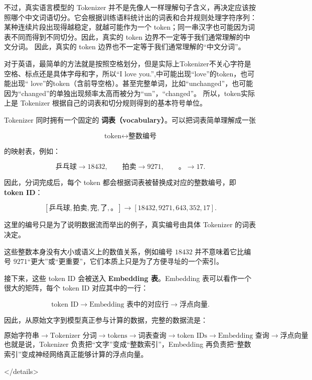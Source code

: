 \documentclass[UTF8,11pt,a4paper]{ctexart}
\begin{document}
不过，真实语言模型的 Tokenizer 并不是先像人一样理解句子含义，再决定应该按照哪个中文词语切分。它会根据训练语料统计出的词表和合并规则处理字符序列：某种连续片段出现得越稳定，就越可能作为一个 token；同一串汉字也可能因为词表不同而得到不同切分。因此，真实的 token 边界不一定等于我们通常理解的中文分词。
因此，真实的 token 边界也不一定等于我们通常理解的“中文分词”。

对于英语，最简单的方法就是按照空格划分，但是实际上Tokenizer不关心字符是空格、标点还是具体字母和字，所以“I love you.”,中可能出现“love”的token，也可能出现“ love”的token（含前导空格）。甚至完整单词，比如“unchanged”，也可能因为“changed”的单独出现频率太高而被分为“un”，“changed”。
所以，token实际上是 Tokenizer 根据自己的词表和切分规则得到的基本符号单位。

Tokenizer 同时拥有一个固定的 \textbf{词表（vocabulary）}。可以把词表简单理解成一张

\[
\text{token}\longleftrightarrow\text{整数编号}
\]

的映射表，例如：

\[
\texttt{乒乓球}\rightarrow18432,\qquad
\texttt{拍卖}\rightarrow9271,\qquad
\texttt{。}\rightarrow17.
\]

因此，分词完成后，每个 token 都会根据词表被替换成对应的整数编号，即 \textbf{token ID}：

\[
[\texttt{乒乓球},\texttt{拍卖},\texttt{完},
\texttt{了},\texttt{。}]
\longrightarrow
[18432,9271,643,352,17].
\]

这里的编号只是为了说明数据流而举出的例子，真实编号由具体 Tokenizer 的词表决定。

这些整数本身没有大小或语义上的数值关系，例如编号 \(18432\) 并不意味着它比编号 \(9271\)“更大”或“更重要”，它们本质上只是为了方便寻址的一个索引。

接下来，这些 token ID 会被送入 \textbf{Embedding 表}。Embedding 表可以看作一个很大的矩阵，每个 token ID 对应其中的一行：

\[
\text{token ID}
\longrightarrow
\text{Embedding 表中的对应行}
\longrightarrow
\text{浮点向量}.
\]

因此，从原始文字到模型真正参与计算的数据，完整的数据流是：

\[
\boxed{
\text{原始字符串}
\rightarrow
\text{Tokenizer 分词}
\rightarrow
\text{tokens}
\rightarrow
\text{词表查询}
\rightarrow
\text{token IDs}
\rightarrow
\text{Embedding 查询}
\rightarrow
\text{浮点向量}
}
\]
也就是说，Tokenizer 负责把“文字”变成“整数索引”，Embedding 再负责把“整数索引”变成神经网络真正能够计算的浮点向量。

</details>
\end{document}

